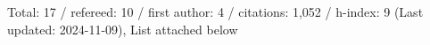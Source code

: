 Total: 17 / refereed: 10 / first author: 4 / citations: 1,052 / h-index: 9 (Last updated: 2024-11-09), List attached below